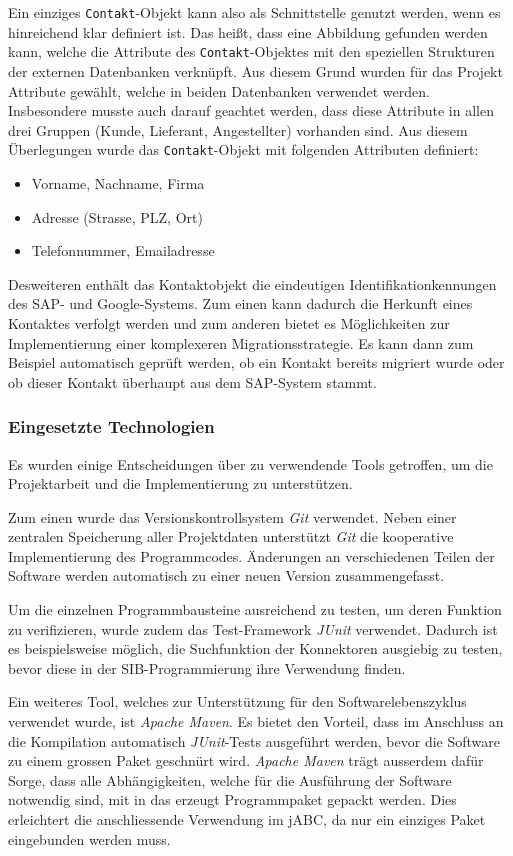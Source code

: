 Ein einziges \lstinline{Contakt}-Objekt kann also als Schnittstelle genutzt werden, wenn es hinreichend klar definiert ist.
Das heißt, dass eine Abbildung gefunden werden kann, welche die Attribute des \lstinline{Contakt}-Objektes mit den speziellen
 Strukturen der externen Datenbanken verknüpft.
Aus diesem Grund wurden für das Projekt Attribute gewählt, welche in beiden Datenbanken verwendet werden.
Insbesondere musste auch darauf geachtet werden, dass diese Attribute in allen drei Gruppen (Kunde, Lieferant,
 Angestellter) vorhanden sind.
Aus diesem Überlegungen wurde das \lstinline{Contakt}-Objekt mit folgenden Attributen definiert:
\begin{itemize}
	\item Vorname, Nachname, Firma
	\item Adresse (Strasse, PLZ, Ort)
	\item Telefonnummer, Emailadresse
\end{itemize}
Desweiteren enthält das Kontaktobjekt die eindeutigen Identifikationkennungen des SAP- und Google-Systems.
Zum einen kann dadurch die Herkunft eines Kontaktes verfolgt werden und zum anderen bietet es Möglichkeiten
 zur Implementierung einer komplexeren Migrationsstrategie.
Es kann dann zum Beispiel automatisch geprüft werden, ob ein Kontakt bereits migriert wurde oder ob dieser
 Kontakt überhaupt aus dem SAP-System stammt.
	
\subsubsection{Eingesetzte Technologien}
Es wurden einige Entscheidungen über zu verwendende Tools getroffen, um die Projektarbeit und die
 Implementierung zu unterstützen.
 
Zum einen wurde das Versionskontrollsystem \emph{Git} verwendet.
Neben einer zentralen Speicherung aller Projektdaten unterstützt \emph{Git} die kooperative Implementierung des Programmcodes.
Änderungen an verschiedenen Teilen der Software werden automatisch zu einer neuen Version zusammengefasst.

Um die einzelnen Programmbausteine ausreichend zu testen, um deren Funktion zu verifizieren, wurde zudem das
 Test-Framework \emph{JUnit} verwendet. Dadurch ist es beispielsweise möglich, die Suchfunktion der Konnektoren ausgiebig
 zu testen, bevor diese in der SIB-Programmierung ihre Verwendung finden.

Ein weiteres Tool, welches zur Unterstützung für den Softwarelebenszyklus verwendet wurde, ist \emph{Apache Maven}.
Es bietet den Vorteil, dass im Anschluss an die Kompilation automatisch \emph{JUnit}-Tests ausgeführt werden, bevor
 die Software zu einem grossen Paket geschnürt wird.
 \emph{Apache Maven} trägt ausserdem dafür Sorge, dass alle Abhängigkeiten, welche für die Ausführung der Software
  notwendig sind, mit in das erzeugt Programmpaket gepackt werden.
 Dies erleichtert die anschliessende Verwendung im jABC, da nur ein einziges Paket eingebunden werden muss.

